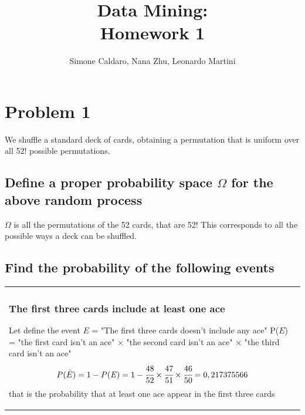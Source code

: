 \documentclass[oneside]{article}			%
\newenvironment{adjustwidth}{\begin{center}\begin{tabular}{p{0.9\textwidth}}   }{\end{tabular} \end{center}}		%
\begin{document}
	\title{Data Mining:\\Homework 1}
	\author{Simone Caldaro, Nana Zhu, Leonardo Martini}

	\maketitle

	\pagestyle{plain}
	\tableofcontents		%
	\clearpage				%



	\section*{Problem 1}We shuffle a standard deck of cards, obtaining a permutation that is uniform over all 52! possible permutations.
	\subsection{Define a proper probability space $\Omega$ for the above random process}
	 	$\Omega$  is all the permutations of the 52 cards, that are 52! \newline
		 This corresponds to all the possible ways a deck can be shuffled.

	\subsection{Find the probability of the following events}

	\begin{adjustwidth}
	\subsubsection{The first three cards include at least one ace}
	Let define the event $\mathit{E}$ = "The first three cards doesn't include any ace" \newline
	P($\mathit{E}$) = "the first card isn't an ace" $\times$ "the second card isn't an ace" $\times$ "the third card isn't an ace"
	\[ P(\bar{E}) = 1 - P(\mathit{E}) = 1 - \cfrac{48}{52} \times \cfrac{47}{51} \times \cfrac{46}{50}  = 0,217375566  \]
	that is the probability that at least one ace appear in the first three cards

	\end{adjustwidth}
\end{document}
